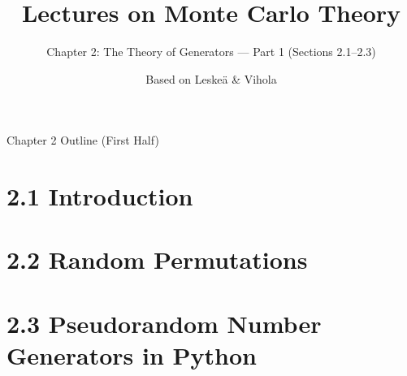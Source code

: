 \documentclass[aspectratio=169,10pt]{beamer}
\title[MC Theory -- Ch.2 (Part 1)]{Lectures on Monte Carlo Theory}
\subtitle{Chapter 2: The Theory of Generators --- Part 1 (Sections 2.1--2.3)}
\author{Based on Leske\"{a} \& Vihola}
\date{}
\begin{document}
\begin{frame}
  \titlepage
\end{frame}

\begin{frame}{Chapter 2 Outline (First Half)}
  \tableofcontents[hideallsubsections]
\end{frame}

\section{2.1 Introduction}
\section{2.2 Random Permutations}
\section{2.3 Pseudorandom Number Generators in Python}
\end{document}
